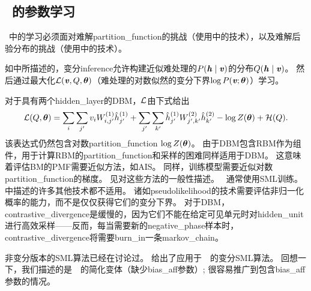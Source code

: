 \subsection{~的参数学习}
\label{sec:dbm_parameter_learning}

~中的学习必须面对难解\gls{partition_function}的挑战（使用中的技术），以及难解后验分布的挑战（使用中的技术）。

如中所描述的，变分\gls{inference}允许构建近似难处理的$P(\boldsymbol{\mathit{h}}  \mid  \boldsymbol{\mathit{v}})$的分布$Q(\boldsymbol{\mathit{h}} \mid \boldsymbol{\mathit{v}})$。
然后通过最大化$\mathcal{L}(\boldsymbol{\mathit{v}}, Q, \boldsymbol{\theta})$（难处理的对数似然的变分下界$\log P(\boldsymbol{\mathit{v}}; \boldsymbol{\theta})$）学习。


对于具有两个\gls{hidden_layer}的\gls{DBM}，$\mathcal{L}$由下式给出
\begin{align}
 \mathcal{L}(Q, \boldsymbol{\theta}) = \sum_i \sum_{j^{\prime}} v_i W_{i,j^{\prime}}^{(1)} 
 \hat h_{j^{\prime}}^{(1)} +  \sum_{j^{\prime}} \sum_{k^{\prime}} \hat h_{j^{\prime}}^{(1)}
 W_{j^{\prime}, k^{\prime}}^{(2)} \hat h_{k^{\prime}}^{(2)} - \log Z(\boldsymbol{\theta}) + \mathcal{H}(Q).
\end{align}
该表达式仍然包含对数\gls{partition_function} $ \log Z(\boldsymbol{\theta}) $。
由于\gls{DBM}包含\gls{RBM}作为组件，用于计算\gls{RBM}的\gls{partition_function}和采样的困难同样适用于\gls{DBM}。
这意味着评估\gls{BM}的\gls{PMF}需要近似方法，如\gls{AIS}。
同样，训练模型需要近似对数\gls{partition_function}的梯度。
见对这些方法的一般性描述。
~通常使用\gls{SML}训练。
中描述的许多其他技术都不适用。
诸如\gls{pseudolikelihood}的技术需要评估非归一化概率的能力，而不是仅仅获得它们的变分下界。
对于\gls{DBM}，\gls{contrastive_divergence}是缓慢的，因为它们不能在给定可见单元时对\gls{hidden_unit}进行高效采样——反而，每当需要新的\gls{negative_phase}样本时，\gls{contrastive_divergence}将需要\gls{burn_in}一条\gls{markov_chain}。

非变分版本的\gls{SML}算法已经在讨论过。
给出了应用于~~的变分\gls{SML}算法。
回想一下，我们描述的是~~的简化变体（缺少\gls{bias_aff}参数）; 很容易推广到包含\gls{bias_aff}参数的情况。


